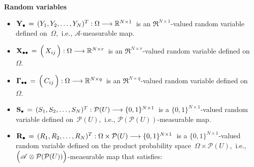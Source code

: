 \vskip 0.2cm
\noindent
\textbf{Random variables}
\begin{itemize}
\item
    $\mathbf{Y}_{\bullet} \,=\, (Y_{1},Y_{2},\ldots,Y_{N})^{T} : \Omega \longrightarrow \mathbb{R}^{N \times 1}$\,
    is an $\Re^{N \times 1}$-valued random variable defined on \,$\Omega$,\,
    i.e., $\mathscr{A}$-measurable map.
\item
    $\Xdotdot\,=\,\left(\,\overset{{\color{white}.}}{X_{ij}}\,\right) : \Omega \longrightarrow \Re^{N \times r}$\,
    is an $\Re^{N \times r}$-valued random variable defined on \,$\Omega$.
\item
    $\Gdotdot\,=\,\left(\,\overset{{\color{white}.}}{C_{ij}}\,\right) : \Omega \longrightarrow \Re^{N \times q}$\,
    is an $\Re^{N \times q}$-valued random variable defined on \,$\Omega$.
\item
    $\mathbf{S}_{\bullet} \,=\, (S_{1},S_{2},\ldots,S_{N})^{T} : \mathcal{P}(U) \longrightarrow \{0,1\}^{N \times 1}$\,
    is a $\{0,1\}^{N \times 1}$-valued random variable defined on \,$\mathcal{P}(U)$,\,
    i.e., $\mathcal{P}(\mathcal{P}(U))$-measurable map.
\item
    $\mathbf{R}_{\bullet} \,=\, (R_{1},R_{2},\ldots,R_{N})^{T} : {\color{black}\Omega \times \mathcal{P}(U)} \longrightarrow \{0,1\}^{N \times 1}$\,
    is a $\{0,1\}^{N \times 1}$-valued random variable defined on the product probability space
    \,$\Omega \times \mathcal{P}(U)$,\,
    i.e.,
    \,$\left(\mathscr{A} \overset{{\color{white}.}}{\otimes} \mathcal{P}(\mathcal{P}(U))\right)$-measurable map
    that satisfies:

\end{itemize}
